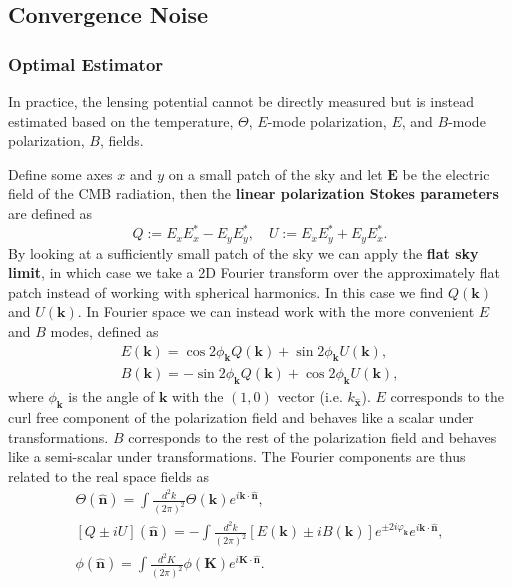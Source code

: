 \documentclass[11pt]{article} %
\begin{document}
\subsection{Convergence Noise}
\subsubsection{Optimal Estimator}
In practice, the lensing potential cannot be directly measured but is instead estimated based on the temperature, $\Theta$, $E$-mode polarization, $E$, and $B$-mode polarization, $B$, fields.

Define some axes $x$ and $y$ on a small patch of the sky and let $\mathbf E$ be the electric field of the CMB radiation, then the \textbf{linear polarization Stokes parameters} are defined as
\begin{equation*}
	Q := E_xE^*_x - E_yE_y^*, \quad U := E_xE_y^* + E_yE_x^*.
\end{equation*} 
By looking at a sufficiently small patch of the sky we can apply the \textbf{flat sky limit}, in which case we take a 2D Fourier transform over the approximately flat patch instead of working with spherical harmonics. In this case we find $Q(\mathbf k)$ and $U(\mathbf k)$. In Fourier space we can instead work with the more convenient $E$ and $B$ modes, defined as
\begin{gather*}
	E(\mathbf k)=\cos 2\phi_{\mathbf k} Q(\mathbf k) + \sin 2\phi_{\mathbf k} U(\mathbf k),\\
	B(\mathbf k)=-\sin 2\phi_{\mathbf k} Q(\mathbf k) + \cos 2\phi_{\mathbf k} U(\mathbf k),
\end{gather*}
where $\phi_\textbf{k}$ is the angle of $\mathbf k$ with the $(1,0)$  vector (i.e. $k_{\hat{\mathbf{x}}}$).
$E$ corresponds to the curl free component of the polarization field and behaves like a scalar under transformations. $B$ corresponds to the rest of the polarization field and behaves like a semi-scalar under transformations. The Fourier components are thus related to the real space fields as
\begin{gather*}
\Theta(\mathbf{\hat{n}}) = \int \frac{d^2 k}{(2\pi)^2} \Theta(\mathbf{k}) e^{i \mathbf{k} \cdot \mathbf{\hat{n}}}, \\
[Q \pm iU](\mathbf{\hat{n}}) = -\int \frac{d^2 k}{(2\pi)^2} \left[ E(\mathbf{k}) \pm iB(\mathbf{k}) \right] e^{\pm 2i \varphi_{\mathbf{k}}} e^{i \mathbf{k} \cdot \mathbf{\hat{n}}}, \\
\phi(\mathbf{\hat{n}}) = \int \frac{d^2 K}{(2\pi)^2} \phi(\mathbf{K}) e^{i \mathbf{K} \cdot \mathbf{\hat{n}}}.
\end{gather*}
\end{document}
